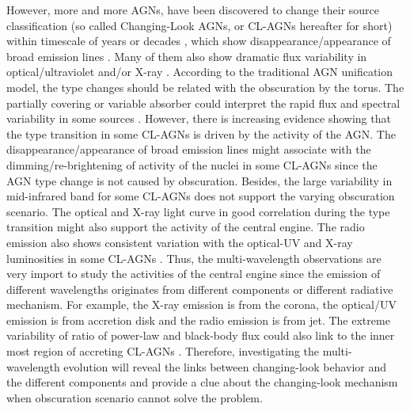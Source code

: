 \documentclass[twocolumn]{aastex63}
\begin{document}
{However, more and more AGNs, have been discovered to change their source classification (so called Changing-Look AGNs, or CL-AGNs hereafter for short) within timescale of years or decades \citep[e.g.][]{2016MNRAS.457..389M, 2016ApJ...826..188R, 2018ApJ...864...27S, 2019ApJ...874....8M,2020MNRAS.491.4925G}, 
which show disappearance/appearance of broad emission lines \citep[e.g.][]{2016MNRAS.457..389M,2019MNRAS.486..123R}. Many of them also show dramatic flux variability in optical/ultraviolet and/or X-ray \citep[e.g.][]{2017ApJ...846L...7S,2019MNRAS.483L..88P}. According to the traditional AGN unification model, the type changes should be related with the obscuration by the torus. The partially covering or variable absorber could interpret the rapid flux and spectral variability in some sources \citep[e.g.][]{2013MNRAS.436.1615M,2014MNRAS.443.2862A,2015ApJ...815...55R,2018MNRAS.481.2470T}. However, there is increasing evidence showing that the type transition in some CL-AGNs is driven by the activity of the AGN. The disappearance/appearance of broad emission lines might associate with the dimming/re-brightening of activity of the nuclei in some CL-AGNs \citep[e.g.][]{2014ApJ...796..134D} since the AGN type change is not caused by obscuration.  Besides, the large variability in mid-infrared band for some CL-AGNs \citep[e.g.][]{2017ApJ...846L...7S} does not support the varying obscuration scenario. The optical and X-ray light curve in good correlation during the type transition might also support the activity of the central engine. The radio emission also shows consistent variation with the optical-UV and X-ray luminosities in some CL-AGNs \citep[e.g.][]{2016MNRAS.460..304K}. Thus, the multi-wavelength observations are very import to study the activities of the central engine since the emission of different wavelengths originates from different components or different radiative mechanism. For example, the X-ray emission is from the corona, the optical/UV emission is from accretion disk and the radio emission is from jet. The extreme variability of ratio of power-law and black-body flux could also link to the inner most region of accreting CL-AGNs \citep[e.g.][]{2019ApJ...883...94T,2020ApJ...898L...1R}.
Therefore, investigating the multi-wavelength evolution will reveal the links between changing-look behavior and the different components and provide a clue about the changing-look mechanism when obscuration scenario cannot solve the problem.}
\end{document}

